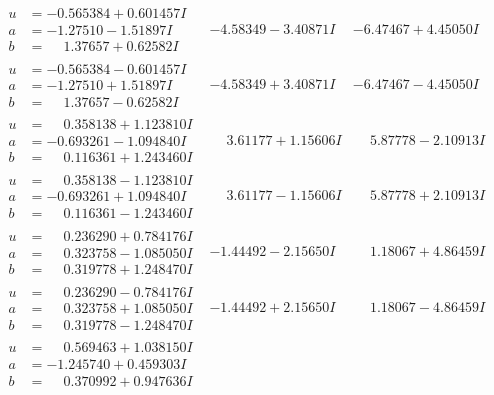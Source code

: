 \documentclass[1p]{elsarticle_modified}
\theoremstyle{definition}
\begin{document}
$$\begin{array}{c|c|c}
\begin{aligned}
u &= -0.565384 + 0.601457 I \\
a &= -1.27510 - 1.51897 I \\
b &= \phantom{-}1.37657 + 0.62582 I\end{aligned}
 & -4.58349 - 3.40871 I & -6.47467 + 4.45050 I \\ \hline\begin{aligned}
u &= -0.565384 - 0.601457 I \\
a &= -1.27510 + 1.51897 I \\
b &= \phantom{-}1.37657 - 0.62582 I\end{aligned}
 & -4.58349 + 3.40871 I & -6.47467 - 4.45050 I \\ \hline\begin{aligned}
u &= \phantom{-}0.358138 + 1.123810 I \\
a &= -0.693261 - 1.094840 I \\
b &= \phantom{-}0.116361 + 1.243460 I\end{aligned}
 & \phantom{-}3.61177 + 1.15606 I & \phantom{-}5.87778 - 2.10913 I \\ \hline\begin{aligned}
u &= \phantom{-}0.358138 - 1.123810 I \\
a &= -0.693261 + 1.094840 I \\
b &= \phantom{-}0.116361 - 1.243460 I\end{aligned}
 & \phantom{-}3.61177 - 1.15606 I & \phantom{-}5.87778 + 2.10913 I \\ \hline\begin{aligned}
u &= \phantom{-}0.236290 + 0.784176 I \\
a &= \phantom{-}0.323758 - 1.085050 I \\
b &= \phantom{-}0.319778 + 1.248470 I\end{aligned}
 & -1.44492 - 2.15650 I & \phantom{-}1.18067 + 4.86459 I \\ \hline\begin{aligned}
u &= \phantom{-}0.236290 - 0.784176 I \\
a &= \phantom{-}0.323758 + 1.085050 I \\
b &= \phantom{-}0.319778 - 1.248470 I\end{aligned}
 & -1.44492 + 2.15650 I & \phantom{-}1.18067 - 4.86459 I \\ \hline\begin{aligned}
u &= \phantom{-}0.569463 + 1.038150 I \\
a &= -1.245740 + 0.459303 I \\
b &= \phantom{-}0.370992 + 0.947636 I\end{aligned}

\end{array}$$
\end{document}
